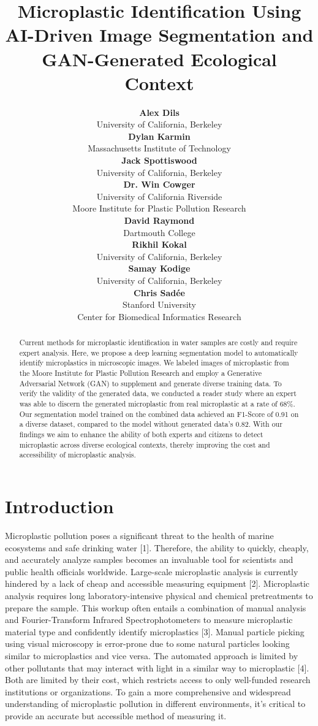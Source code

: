 \documentclass{article}
\title{Microplastic Identification Using AI-Driven Image Segmentation and GAN-Generated Ecological Context}
\author{
\begin{minipage}[t]{0.45\textwidth}
  \centering
  \normalsize
  \textbf{Alex Dils} \\
  {\normalfont University of California, Berkeley} \\[1.25em]
  \textbf{Dylan Karmin} \\
  {\normalfont Massachusetts Institute of Technology} \\[1.25em]
  \textbf{Jack Spottiswood} \\
  {\normalfont University of California, Berkeley} \\[1.25em]
  \textbf{Dr. Win Cowger} \\
  {\normalfont University of California Riverside} \\
  {\normalfont Moore Institute for Plastic Pollution Research}
\end{minipage}
\hfill
\begin{minipage}[t]{0.45\textwidth}
  \centering
  \normalsize
  \textbf{David Raymond} \\
  {\normalfont Dartmouth College} \\[1.25em]
  \textbf{Rikhil Kokal} \\
  {\normalfont University of California, Berkeley} \\[1.25em]
  \textbf{Samay Kodige} \\
  {\normalfont University of California, Berkeley} \\[1.25em]
  \textbf{Chris Sad\'ee} \\
  {\normalfont Stanford University} \\
  {\normalfont Center for Biomedical Informatics Research}
\end{minipage}
}
\begin{document}
\maketitle

\begin{abstract}
  Current methods for microplastic identification in water samples are costly and require expert analysis. Here, we propose a deep learning segmentation model to automatically identify microplastics in microscopic images. We labeled images of microplastic from the Moore Institute for Plastic Pollution Research and employ a Generative Adversarial Network (GAN) to supplement and generate diverse training data. To verify the validity of the generated data, we conducted a reader study where an expert was able to discern the generated microplastic from real microplastic at a rate of 68\%. Our segmentation model trained on the combined data achieved an F1-Score of 0.91 on a diverse dataset, compared to the model without generated data's 0.82. With our findings we aim to enhance the ability of both experts and citizens to detect microplastic across diverse ecological contexts, thereby improving the cost and accessibility of microplastic analysis.
\end{abstract}

\section{Introduction}


Microplastic pollution poses a significant threat to the health of marine ecosystems and safe drinking water [1]. Therefore, the ability to quickly, cheaply, and accurately analyze samples becomes an invaluable tool for scientists and public health officials worldwide. Large-scale microplastic analysis is currently hindered by a lack of cheap and accessible measuring equipment [2]. Microplastic analysis requires long laboratory-intensive physical and chemical pretreatments to prepare the sample. This workup often entails a combination of manual analysis and Fourier-Transform Infrared Spectrophotometers to measure microplastic material type and confidently identify microplastics [3]. Manual particle picking using visual microscopy is error-prone due to some natural particles looking similar to microplastics and vice versa. The automated approach is limited by other pollutants that may interact with light in a similar way to microplastic [4]. Both are limited by their cost, which restricts access to only well-funded research institutions or organizations. To gain a more comprehensive and widespread understanding of microplastic pollution in different environments, it's critical to provide an accurate but accessible method of measuring it.
\end{document}
